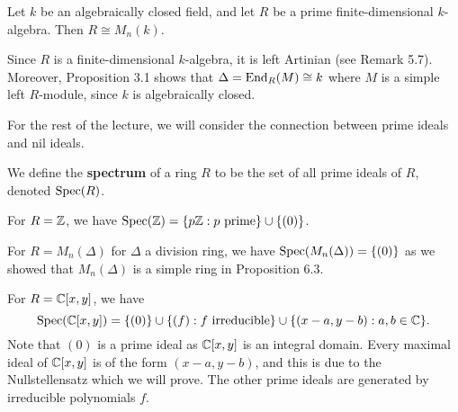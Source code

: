 \begin{cor}
Let $k$ be an algebraically closed field, and let $R$ be a prime finite-dimensional $k$-algebra. Then 
$R \cong M_n(k)$. 
\end{cor}
\begin{pf}
Since $R$ is a finite-dimensional $k$-algebra, it is left Artinian (see Remark 5.7). Moreover,
Proposition 3.1 shows that $\Delta = \operatorname{End}_R(M) \cong k$ where $M$ is a simple left 
$R$-module, since $k$ is algebraically closed. 
\end{pf}

For the rest of the lecture, we will consider the connection between prime ideals and nil ideals. 

\begin{defn}
We define the {\bf spectrum} of a ring $R$ to be the set of all prime ideals of $R$,
denoted $\operatorname{Spec}(R)$. 
\end{defn}

\begin{exmp}
For $R = \mathbb{Z}$, we have $\operatorname{Spec}(\mathbb{Z}) = \{p\mathbb{Z} : p \text{ prime}\} \cup \{(0)\}$. 
\end{exmp}

\begin{exmp}
For $R = M_n(\Delta)$ for $\Delta$ a division ring, we have $\operatorname{Spec}(M_n(\Delta)) = \{(0)\}$ as we 
showed that $M_n(\Delta)$ is a simple ring in Proposition 6.3.
\end{exmp}

\begin{exmp}
For $R = \mathbb{C}[x, y]$, we have
\[ \operatorname{Spec}(\mathbb{C}[x, y]) = \{(0)\} \cup \{(f) : f \text{ irreducible}\} \cup \{(x-a, y-b) : a, b \in \mathbb{C}\}. \]
Note that $(0)$ is a prime ideal as $\mathbb{C}[x, y]$ is an integral domain. Every maximal ideal of 
$\mathbb{C}[x, y]$ is of the form $(x-a, y-b)$, and this is due to the Nullstellensatz which we will prove. 
The other prime ideals are generated by irreducible polynomials $f$. 
\end{exmp}

